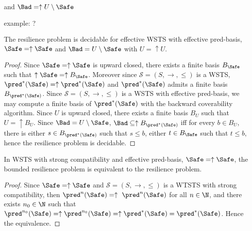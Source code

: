 
and $\Bad = \uparrow U \setminus \Safe $

example: ?


\begin{theorem}\label{up-up}
The resilience problem is decidable for effective WSTS with effective pred-basis, $\Safe=\uparrow \Safe$
and $\Bad= U \setminus \Safe$ with $U = \uparrow U$.
\end{theorem}


\begin{proof}
Since $\Safe=\uparrow \Safe$ is upward closed, there exists a finite basis $B_{ \Safe}$ such that $\uparrow \Safe = \uparrow B_{\Safe}$. 
Moreover since $\mathscr{S}=(S,\rightarrow,\leq)$ is a WSTS,  $\pred^*(\Safe)=\uparrow \pred^*(\Safe)$ and $\pred^*(\Safe)$ admits a finite basis $B_{\pred^*(\Safe)}$. Since $\mathscr{S}=(S,\rightarrow,\leq)$ is a WSTS  with effective pred-basis, we may compute a finite basis of $\pred^*(\Safe)$ with the backward coverability algorithm. 
Since $U$  is upward closed, there exists a finite basis $B_{U}$ such that $U = \uparrow B_{U}$. %
Since $\Bad = U \setminus \Safe$, $\Bad \subseteq \uparrow B_{\pred^*(\Safe)}$ iff for every $b \in B_{U}$, there is either $s \in B_{\pred^*(\Safe)}$ such that $s \leq b$, either $t \in B_{\Safe}$ such that $t\leq b$,
hence the resilience problem is decidable.
\end{proof}

\begin{proposition}
In WSTS with strong compatibility and effective pred-basis,  $\Safe=\uparrow \Safe$, the bounded resilience problem is equivalent to the resilience problem.
\end{proposition}

\begin{proof}
Since $\Safe=\uparrow \Safe$ and
$\mathscr{S}=(S,\rightarrow,\leq)$ is a WTSTS with strong %
compatibility, then $\pred^n(\Safe)= \uparrow~\pred^n(\Safe)$ for all $n \in \N$,
and there exists $n_0 \in \N$ such that 
$\pred^{n_0}(\Safe) = \uparrow \pred^{n_0}(\Safe) = \uparrow \pred^*(\Safe) = \pred^*(\Safe)$.
Hence the equivalence.
\end{proof}

